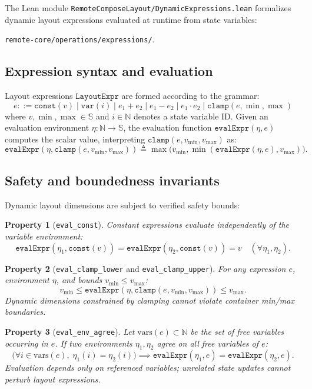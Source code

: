 \documentclass[11pt,a4paper]{article}
\newcommand{\Sc}{\mathbb{S}}
\newcommand{\lo}[1]{\texttt{#1}}       %
\newcommand{\file}[1]{\texttt{#1}}
\theoremstyle{definition}
\theoremstyle{plain}
\newtheorem{property}{Property}[section]
\theoremstyle{remark}
\begin{document}
The Lean module \file{RemoteComposeLayout/DynamicExpressions.lean} formalizes
dynamic layout expressions evaluated at runtime from state variables:
\begin{center}
\file{remote-core/operations/expressions/}.
\end{center}

\subsection{Expression syntax and evaluation}
\label{sec:expr-eval}

Layout expressions $\lo{LayoutExpr}$ are formed according to the grammar:
\[
  e ::= \lo{const}(v) \mid \lo{var}(i) \mid e_1 + e_2 \mid e_1 - e_2 \mid e_1 \cdot e_2 \mid \lo{clamp}(e, \min, \max)
\]
where $v, \min, \max \in \Sc$ and $i \in \mathbb{N}$ denotes a state variable ID.
Given an evaluation environment $\eta : \mathbb{N} \to \Sc$, the evaluation function
$\lo{evalExpr}(\eta, e)$ computes the scalar value, interpreting $\lo{clamp}(e, v_{\min}, v_{\max})$ as:
\[
  \lo{evalExpr}(\eta, \lo{clamp}(e, v_{\min}, v_{\max})) \triangleq \max\bigl(v_{\min}, \min(\lo{evalExpr}(\eta, e), v_{\max})\bigr).
\]

\subsection{Safety and boundedness invariants}
\label{sec:expr-invariants}

Dynamic layout dimensions are subject to verified safety bounds:

\begin{property}[\lo{eval\_const}]
Constant expressions evaluate independently of the variable environment:
\[
  \lo{evalExpr}(\eta_1, \lo{const}(v)) = \lo{evalExpr}(\eta_2, \lo{const}(v)) = v \quad (\forall \eta_1, \eta_2).
\]
\end{property}

\begin{property}[\lo{eval\_clamp\_lower} and \lo{eval\_clamp\_upper}]
For any expression $e$, environment $\eta$, and bounds $v_{\min} \le v_{\max}$:
\[
  v_{\min} \le \lo{evalExpr}(\eta, \lo{clamp}(e, v_{\min}, v_{\max})) \le v_{\max}.
\]
Dynamic dimensions constrained by clamping cannot violate container min/max boundaries.
\end{property}

\begin{property}[\lo{eval\_env\_agree}]
Let $\mathrm{vars}(e) \subset \mathbb{N}$ be the set of free variables occurring in $e$.
If two environments $\eta_1, \eta_2$ agree on all free variables of $e$:
\[
  \bigl(\forall i \in \mathrm{vars}(e),\; \eta_1(i) = \eta_2(i)\bigr) \implies
  \lo{evalExpr}(\eta_1, e) = \lo{evalExpr}(\eta_2, e).
\]
Evaluation depends only on referenced variables; unrelated state updates cannot perturb layout expressions.
\end{property}
\end{document}
